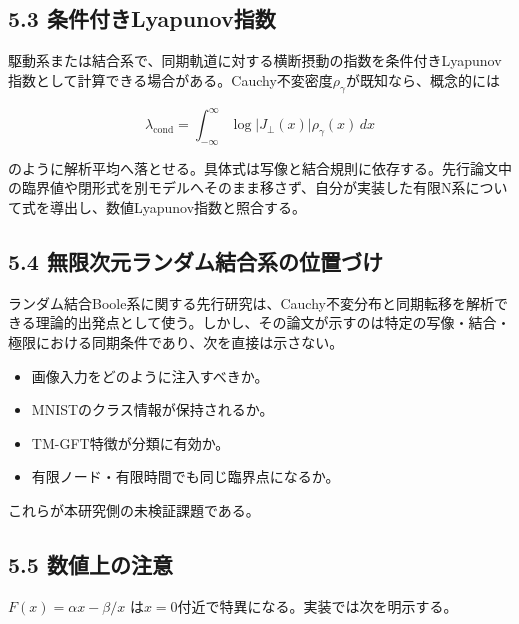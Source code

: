 \documentclass[11pt,a4paper]{ltjsarticle}
\begin{document}
\subsection*{\textcolor{researchblue}{5.3 条件付きLyapunov指数}}

駆動系または結合系で、同期軌道に対する横断摂動の指数を条件付きLyapunov指数として計算できる場合がある。Cauchy不変密度\(\rho_{\gamma}\)が既知なら、概念的には\par

\[
\lambda_{\mathrm{cond}}=\int_{-\infty}^{\infty}\log\left|J_{\perp}(x)\right|\rho_{\gamma}(x)\,dx
\]

のように解析平均へ落とせる。具体式は写像と結合規則に依存する。先行論文中の臨界値や閉形式を別モデルへそのまま移さず、自分が実装した有限N系について式を導出し、数値Lyapunov指数と照合する。\par

\subsection*{\textcolor{researchblue}{5.4 無限次元ランダム結合系の位置づけ}}

ランダム結合Boole系に関する先行研究は、Cauchy不変分布と同期転移を解析できる理論的出発点として使う。しかし、その論文が示すのは特定の写像・結合・極限における同期条件であり、次を直接は示さない。\par

\begin{itemize}

\item 画像入力をどのように注入すべきか。

\item MNISTのクラス情報が保持されるか。

\item TM-GFT特徴が分類に有効か。

\item 有限ノード・有限時間でも同じ臨界点になるか。

\end{itemize}

これらが本研究側の未検証課題である。\par

\subsection*{\textcolor{researchblue}{5.5 数値上の注意}}

\(F(x)=\alpha x-\beta/x\) は\(x=0\)付近で特異になる。実装では次を明示する。\par
\end{document}
